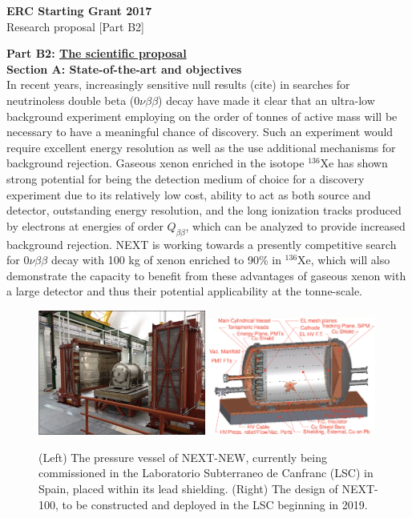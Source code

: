 \documentclass[11pt,a4paper]{article}
\begin{document}


\begin{center}
	\large
	\textbf{ERC Starting Grant 2017}\\
	Research proposal [Part B2]\\[2.0\baselineskip]
\end{center}

\noindent\textbf{Part B2: \underline{The scientific proposal}}\\

{\noindent\textbf{Section A: State-of-the-art and objectives}}\\
In recent years, increasingly sensitive null results (cite) in searches for neutrinoless double beta ($0\nu\beta\beta$) decay have made it clear that an ultra-low background experiment 
employing on the order of tonnes of active mass will be necessary to have a meaningful chance of discovery.  Such an experiment would require excellent energy resolution as well as the use
additional mechanisms for background rejection.  Gaseous xenon enriched in the isotope $^{136}$Xe has shown strong potential for being the 
detection medium of choice for a discovery experiment due to its relatively low cost, ability to act as both source and detector, outstanding energy resolution, and the long ionization 
tracks produced by electrons at energies of order $Q_{\beta\beta}$, which can be analyzed to provide increased background rejection.  NEXT is working towards a presently competitive search 
for $0\nu\beta\beta$ decay with 100 kg of xenon enriched to 90\% in $^{136}$Xe, which will also demonstrate the capacity to benefit from these advantages of gaseous xenon with a 
large detector and thus their potential applicability at the tonne-scale.

\begin{figure}[!htb]
	\centering
	\includegraphics[width= 0.49\textwidth]{fig/NEXT_NEW.png}
	\includegraphics[width= 0.49\textwidth]{fig/NEXT100.png}
	\caption{(Left) The pressure vessel of NEXT-NEW, currently being commissioned in the Laboratorio Subterraneo de Canfranc (LSC) in Spain, placed within its lead shielding. (Right) The design of NEXT-100, to be constructed and deployed in the LSC beginning in 2019.} \label{fig.NEXT}
\end{figure}
\end{document}
